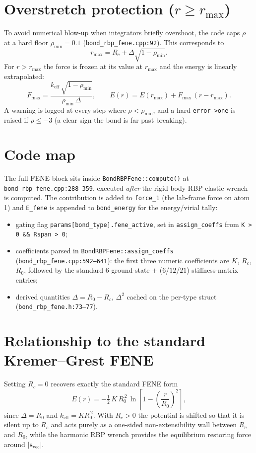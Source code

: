\documentclass[11pt]{article}
\begin{document}
\section*{Overstretch protection ($r \ge r_{\max}$)}

To avoid numerical blow-up when integrators briefly overshoot, the code caps
$\rho$ at a hard floor $\rho_{\min} = 0.1$
(\texttt{bond\_rbp\_fene.cpp:92}). This corresponds to
\begin{equation}
r_{\max} = R_c + \Delta\sqrt{1 - \rho_{\min}}.
\end{equation}
For $r > r_{\max}$ the force is frozen at its value at $r_{\max}$ and the energy
is linearly extrapolated:
\begin{equation}
F_{\max} = \frac{k_{\text{eff}}\,\sqrt{1-\rho_{\min}}}{\rho_{\min}\,\Delta},
\qquad
E(r) = E(r_{\max}) + F_{\max}\,(r - r_{\max}).
\end{equation}
A warning is logged at every step where $\rho < \rho_{\min}$, and a hard
\texttt{error->one} is raised if $\rho \le -3$ (a clear sign the bond is far
past breaking).

\section*{Code map}

The full FENE block sits inside \texttt{BondRBPFene::compute()} at
\texttt{bond\_rbp\_fene.cpp:288--359}, executed \emph{after} the rigid-body RBP
elastic wrench is computed. The contribution is added to \texttt{force\_1} (the
lab-frame force on atom 1) and \texttt{E\_fene} is appended to
\texttt{bond\_energy} for the energy/virial tally:
\begin{itemize}
  \item gating flag \texttt{params[bond\_type].fene\_active}, set in
        \texttt{assign\_coeffs} from \texttt{K > 0 \&\& Rspan > 0};
  \item coefficients parsed in \texttt{BondRBPFene::assign\_coeffs}
        (\texttt{bond\_rbp\_fene.cpp:592--641}): the first three numeric
        coefficients are $K$, $R_c$, $R_0$, followed by the standard $6$
        ground-state $+$ ($6$/$12$/$21$) stiffness-matrix entries;
  \item derived quantities $\Delta = R_0 - R_c$, $\Delta^2$ cached on the
        per-type struct (\texttt{bond\_rbp\_fene.h:73--77}).
\end{itemize}

\section*{Relationship to the standard Kremer--Grest FENE}

Setting $R_c = 0$ recovers exactly the standard FENE form
\begin{equation}
E(r) = -\tfrac{1}{2}\, K\, R_0^{\,2}\,
\ln\!\left[1 - \left(\frac{r}{R_0}\right)^{\!2}\right],
\end{equation}
since $\Delta = R_0$ and $k_{\text{eff}} = K R_0^{\,2}$. With $R_c > 0$ the
potential is shifted so that it is silent up to $R_c$ and acts purely as a
one-sided non-extensibility wall between $R_c$ and $R_0$, while the harmonic
RBP wrench provides the equilibrium restoring force around
$|\mathbf{s}_{\text{vec}}|$.
\end{document}
